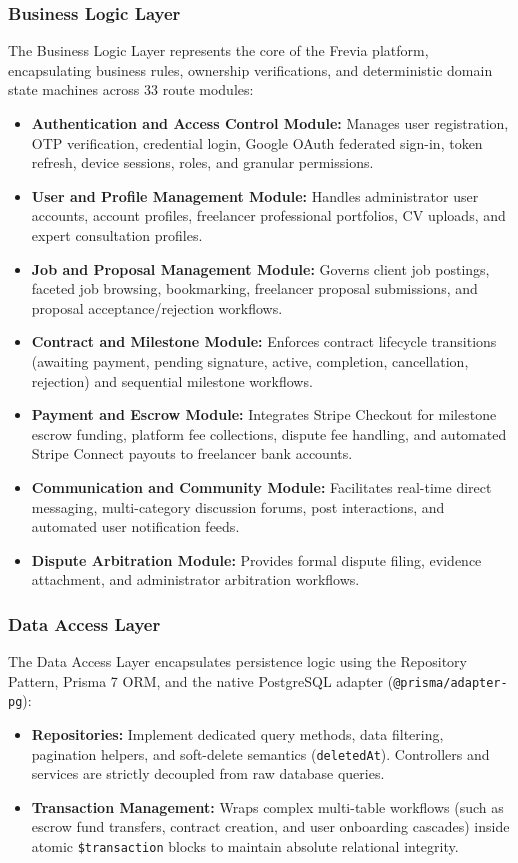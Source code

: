 \subsubsection*{Business Logic Layer}
The Business Logic Layer represents the core of the Frevia platform, encapsulating business rules, ownership verifications, and deterministic domain state machines across 33 route modules:
\begin{itemize}[leftmargin=*]
    \item \textbf{Authentication and Access Control Module:} Manages user registration, OTP verification, credential login, Google OAuth federated sign-in, token refresh, device sessions, roles, and granular permissions.
    \item \textbf{User and Profile Management Module:} Handles administrator user accounts, account profiles, freelancer professional portfolios, CV uploads, and expert consultation profiles.
    \item \textbf{Job and Proposal Management Module:} Governs client job postings, faceted job browsing, bookmarking, freelancer proposal submissions, and proposal acceptance/rejection workflows.
    \item \textbf{Contract and Milestone Module:} Enforces contract lifecycle transitions (awaiting payment, pending signature, active, completion, cancellation, rejection) and sequential milestone workflows.
    \item \textbf{Payment and Escrow Module:} Integrates Stripe Checkout for milestone escrow funding, platform fee collections, dispute fee handling, and automated Stripe Connect payouts to freelancer bank accounts.
    \item \textbf{Communication and Community Module:} Facilitates real-time direct messaging, multi-category discussion forums, post interactions, and automated user notification feeds.
    \item \textbf{Dispute Arbitration Module:} Provides formal dispute filing, evidence attachment, and administrator arbitration workflows.
\end{itemize}

\subsubsection*{Data Access Layer}
The Data Access Layer encapsulates persistence logic using the Repository Pattern, Prisma 7 ORM, and the native PostgreSQL adapter (\texttt{@prisma/\allowbreak{}adapter-\allowbreak{}pg}):
\begin{itemize}[leftmargin=*]
    \item \textbf{Repositories:} Implement dedicated query methods, data filtering, pagination helpers, and soft-delete semantics (\texttt{deletedAt}). Controllers and services are strictly decoupled from raw database queries.
    \item \textbf{Transaction Management:} Wraps complex multi-table workflows (such as escrow fund transfers, contract creation, and user onboarding cascades) inside atomic \texttt{\$transaction} blocks to maintain absolute relational integrity.
\end{itemize}

